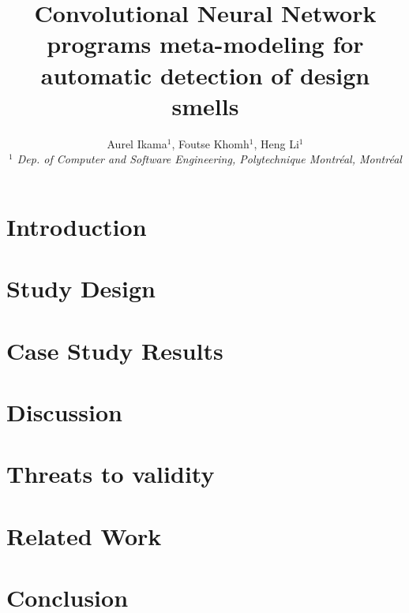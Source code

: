 \documentclass[10pt, conference]{IEEEtran}
\title{Convolutional Neural Network programs meta-modeling for automatic detection of design smells}
\author{Aurel Ikama$^{1}$, Foutse Khomh$^{1}$, Heng Li$^{1}$
    \\
    \emph{$^{1}$ Dep. of Computer and Software Engineering, Polytechnique Montréal, Montréal}}
\begin{document}
\maketitle






\section{Introduction}

\section{Study Design}

\section{Case Study Results}




\section{Discussion}


\section{Threats to validity}


\section{Related Work}


\section{Conclusion}


\balance



\end{document}
